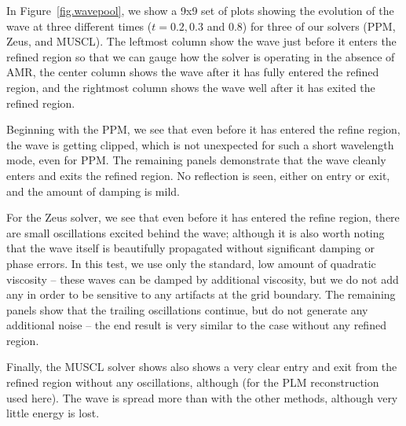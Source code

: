 In Figure~\ref{fig.wavepool}, we show a 9x9 set of plots showing the evolution of the wave at three different times ($t = 0.2, 0.3$ and 0.8) for three of our solvers (PPM, Zeus, and MUSCL).  The leftmost column show the wave just before it enters the refined region so that we can gauge how the solver is operating in the absence of AMR, the center column shows the wave after it has fully entered the refined region, and the rightmost column shows the wave well after it has exited the refined region.

Beginning with the PPM, we see that even before it has entered the refine region, the wave is getting clipped, which is not unexpected for such a short wavelength mode, even for PPM.  The remaining panels demonstrate that the wave cleanly enters and exits the refined region.  No reflection is seen, either on entry or exit, and the amount of damping is mild.

For the Zeus solver, we see that even before it has entered the refine region, there are small oscillations excited behind the wave; although it is also worth noting that the wave itself is beautifully propagated without significant damping or phase errors.  In this test, we use only the standard, low amount of quadratic viscosity -- these waves can be damped by additional viscosity, but we do not add any in order to be sensitive to any artifacts at the grid boundary.  The remaining panels show that the trailing oscillations continue, but do not generate any additional noise -- the end result is very similar to the case without any refined region.

Finally, the MUSCL solver shows also shows a very clear entry and exit from the refined region without any oscillations, although (for the PLM reconstruction used here).  The wave is spread more than with the other methods, although very little energy is lost.

